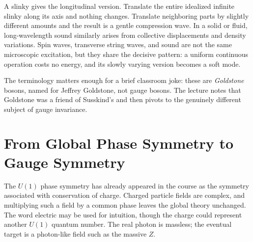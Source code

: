 \begin{classroomqa}
\end{classroomqa}

A slinky gives the longitudinal version. Translate the entire idealized
infinite slinky along its axis and nothing changes. Translate neighboring
parts by slightly different amounts and the result is a gentle compression
wave. In a solid or fluid, long-wavelength sound similarly arises from
collective displacements and density variations. Spin waves, transverse
string waves, and sound are not the same microscopic excitation, but they
share the decisive pattern: a uniform continuous operation costs no energy,
and its slowly varying version becomes a soft mode.

The terminology matters enough for a brief classroom joke: these are
\emph{Goldstone} bosons, named for Jeffrey Goldstone, not gauge bosons.
The lecture notes that Goldstone was a friend of Susskind's and then pivots
to the genuinely different subject of gauge invariance.

\section{From Global Phase Symmetry to Gauge Symmetry}

The \(U(1)\) phase symmetry has already appeared in the course as the symmetry
associated with conservation of charge. Charged particle fields are complex,
and multiplying such a field by a common phase leaves the global theory
unchanged. The word electric may be used for intuition, though the charge
could represent another \(U(1)\) quantum number. The real photon is massless;
the eventual target is a photon-like field such as the massive \(Z\).

